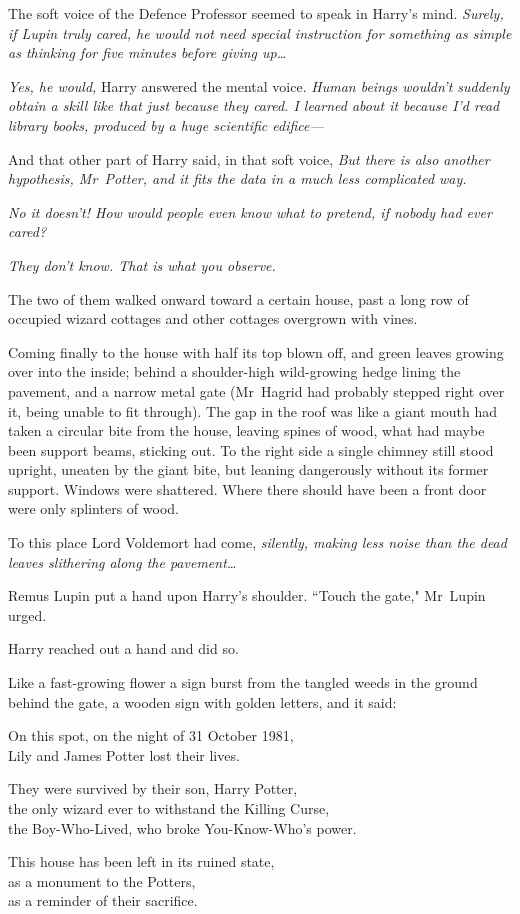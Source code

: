 The soft voice of the Defence Professor seemed to speak in Harry's mind. \emph{Surely, if Lupin truly cared, he would not need special instruction for something as simple as thinking for five minutes before giving up…}

\emph{Yes, he would,} Harry answered the mental voice. \emph{Human beings wouldn't suddenly obtain a skill like that just because they cared. I learned about it because I'd read library books, produced by a huge scientific edifice—}

And that other part of Harry said, in that soft voice, \emph{But there is also another hypothesis, Mr~Potter, and it fits the data in a much less complicated way.}

\emph{No it doesn't! How would people even know what to pretend, if nobody had ever cared?}

\emph{They don't know. That is what you observe.}

The two of them walked onward toward a certain house, past a long row of occupied wizard cottages and other cottages overgrown with vines.

Coming finally to the house with half its top blown off, and green leaves growing over into the inside; behind a shoulder-high wild-growing hedge lining the pavement, and a narrow metal gate (Mr~Hagrid had probably stepped right over it, being unable to fit through). The gap in the roof was like a giant mouth had taken a circular bite from the house, leaving spines of wood, what had maybe been support beams, sticking out. To the right side a single chimney still stood upright, uneaten by the giant bite, but leaning dangerously without its former support. Windows were shattered. Where there should have been a front door were only splinters of wood.

To this place Lord Voldemort had come, \emph{silently, making less noise than the dead leaves slithering along the pavement…}

Remus Lupin put a hand upon Harry's shoulder. ``Touch the gate," Mr~Lupin urged.

Harry reached out a hand and did so.

Like a fast-growing flower a sign burst from the tangled weeds in the ground behind the gate, a wooden sign with golden letters, and it said:

\begin{center}
On this spot, on the night of 31 October 1981,\\
Lily and James Potter lost their lives.

They were survived by their son, Harry Potter,\\
the only wizard ever to withstand the Killing Curse,\\
the Boy-Who-Lived, who broke You-Know-Who's power.

This house has been left in its ruined state,\\
as a monument to the Potters,\\
as a reminder of their sacrifice.
\end{center}

